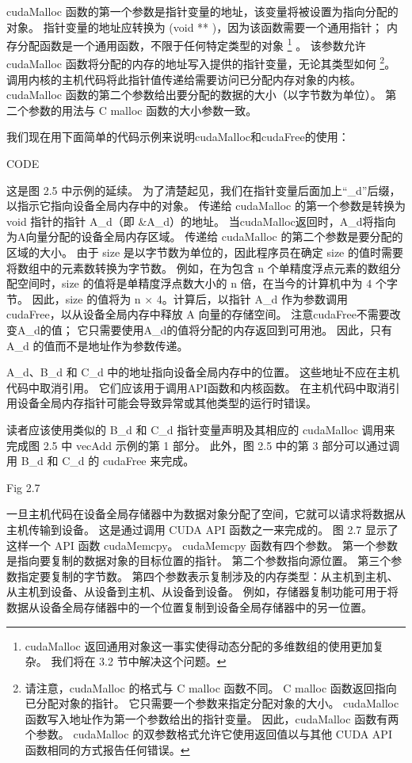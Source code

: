 cudaMalloc 函数的第一个参数是指针变量的地址，该变量将被设置为指向分配的对象。
指针变量的地址应转换为 (void ** )，因为该函数需要一个通用指针； 内存分配函数是一个通用函数，不限于任何特定类型的对象
\footnote{cudaMalloc 返回通用对象这一事实使得动态分配的多维数组的使用更加复杂。 我们将在 3.2 节中解决这个问题。} 。
该参数允许 cudaMalloc 函数将分配的内存的地址写入提供的指针变量，无论其类型如何
\footnote{请注意，cudaMalloc 的格式与 C malloc 函数不同。 C malloc 函数返回指向已分配对象的指针。 
它只需要一个参数来指定分配对象的大小。 cudaMalloc 函数写入地址作为第一个参数给出的指针变量。 
因此，cudaMalloc 函数有两个参数。 
cudaMalloc 的双参数格式允许它使用返回值以与其他 CUDA API 函数相同的方式报告任何错误。}。
调用内核的主机代码将此指针值传递给需要访问已分配内存对象的内核。 
cudaMalloc 函数的第二个参数给出要分配的数据的大小（以字节数为单位）。 
第二个参数的用法与 C malloc 函数的大小参数一致。

我们现在用下面简单的代码示例来说明cudaMalloc和cudaFree的使用：

{\color{red} CODE}

这是图 2.5 中示例的延续。 为了清楚起见，我们在指针变量后面加上“\_d”后缀，以指示它指向设备全局内存中的对象。 
传递给 cudaMalloc 的第一个参数是转换为 void 指针的指针 A\_d（即 \&A\_d）的地址。 
当cudaMalloc返回时，A\_d将指向为A向量分配的设备全局内存区域。 传递给 cudaMalloc 的第二个参数是要分配的区域的大小。 
由于 size 是以字节数为单位的，因此程序员在确定 size 的值时需要将数组中的元素数转换为字节数。 
例如，在为包含 n 个单精度浮点元素的数组分配空间时，size 的值将是单精度浮点数大小的 n 倍，在当今的计算机中为 4 个字节。 
因此，size 的值将为 n × 4。计算后，以指针 A\_d 作为参数调用 cudaFree，以从设备全局内存中释放 A 向量的存储空间。 
注意cudaFree不需要改变A\_d的值； 它只需要使用A\_d的值将分配的内存返回到可用池。 
因此，只有 A\_d 的值而不是地址作为参数传递。

A\_d、B\_d 和 C\_d 中的地址指向设备全局内存中的位置。 这些地址不应在主机代码中取消引用。 
它们应该用于调用API函数和内核函数。 在主机代码中取消引用设备全局内存指针可能会导致异常或其他类型的运行时错误。

读者应该使用类似的 B\_d 和 C\_d 指针变量声明及其相应的 cudaMalloc 调用来完成图 2.5 中 vecAdd 示例的第 1 部分。 
此外，图 2.5 中的第 3 部分可以通过调用 B\_d 和 C\_d 的 cudaFree 来完成。

{\color{red} Fig 2.7}

一旦主机代码在设备全局存储器中为数据对象分配了空间，它就可以请求将数据从主机传输到设备。 
这是通过调用 CUDA API 函数之一来完成的。 图 2.7 显示了这样一个 API 函数 cudaMemcpy。 
cudaMemcpy 函数有四个参数。 第一个参数是指向要复制的数据对象的目标位置的指针。 第二个参数指向源位置。 
第三个参数指定要复制的字节数。 第四个参数表示复制涉及的内存类型：从主机到主机、从主机到设备、从设备到主机、从设备到设备。 
例如，存储器复制功能可用于将数据从设备全局存储器中的一个位置复制到设备全局存储器中的另一位置。

